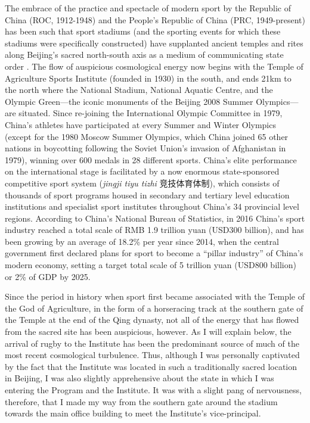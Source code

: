 \begin{CJK}{UTF8}{gbsn}
The embrace of the practice and spectacle of modern sport by the Republic of China (ROC, 1912-1948) and the People's Republic of China (PRC, 1949-present) has been such that sport stadiums (and the sporting events for which these stadiums were specifically constructed) have supplanted ancient temples and rites along Beijing's sacred north-south axis as a medium of communicating state order \citep{Brownell1995}.  The flow of auspicious cosmological energy now begins with the Temple of Agriculture Sports Institute (founded in 1930) in the south, and ends 21km to the north where the National Stadium, National Aquatic Centre, and the Olympic Green---the iconic monuments of the Beijing 2008 Summer Olympics---are situated.  Since re-joining the International Olympic Committee in 1979, China's athletes have participated at every Summer and Winter Olympics (except for the 1980 Moscow Summer Olympics, which China joined 65 other nations in boycotting following the Soviet Union's invasion of Afghanistan in 1979), winning over 600 medals in 28 different sports.  China's elite performance on the international stage is facilitated by a now enormous state-sponsored competitive sport system (\textit{jingji tiyu tizhi} 竞技体育体制), which consists of thousands of sport programs housed in secondary and tertiary level education institutions and specialist sport institutes throughout China's 34 provincial level regions.  According to China's National Bureau of Statistics, in 2016 China's sport industry reached a total scale of RMB 1.9 trillion yuan (USD300 billion), and has been growing by an average of 18.2\% per year since 2014, when the central government first declared plans for sport to become a ``pillar industry'' of China's modern economy, setting a target total scale of 5 trillion yuan (USD800 billion) or 2\% of GDP by 2025.

Since the period in history when sport first became associated with the Temple of the God of Agriculture, in the form of a horseracing track at the southern gate of the Temple at the end of the Qing dynasty, not all of the energy that has flowed from the sacred site has been auspicious, however.  As I will explain below, the arrival of rugby to the Institute has been the predominant source of much of the most recent cosmological turbulence.  Thus, although I was personally captivated by the fact that the Institute was located in such a traditionally sacred location in Beijing, I was also slightly apprehensive about the state in which I was entering the Program and the Institute. It was with a slight pang of nervousness, therefore, that I made my way from the southern gate around the stadium towards the main office building to meet the Institute's vice-principal.


\end{CJK}
